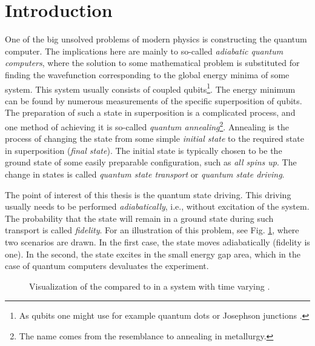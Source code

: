 \chapter*{Introduction}
One of the big unsolved problems of modern physics is constructing the quantum computer. The implications here are mainly to so-called \emph{adiabatic quantum computers}, where the solution to some mathematical problem is substituted for finding the wavefunction corresponding to the global energy minima of some system. This system usually consists of coupled qubits\footnote{As qubits one might use for example quantum dots \citep{dots} or Josephson junctions \citep{josephson}.}. The energy minimum can be found by numerous measurements of the specific superposition of qubits. The preparation of such a state in superposition is a complicated process, and one method of achieving it is so-called \emph{quantum annealing}\footnote{The name comes from the resemblance to annealing in metallurgy.}. Annealing is the process of changing the state from some simple \emph{initial state} to the required state in superposition (\emph{final state}). The initial state is typically chosen to be the ground state of some easily preparable configuration, such as \emph{all spins up}. The change in states is called \emph{quantum state transport} or \emph{quantum state driving}.

The point of interest of this thesis is the quantum state driving. This driving usually needs to be performed \emph{adiabatically}, i.e., without excitation of the system. The probability that the state will remain in a ground state during such transport is called \emph{fidelity}. For an illustration of this problem, see Fig. \ref{fig:introDriving}, where two scenarios are drawn. In the first case, the state moves adiabatically (fidelity is one). In the second, the state excites in the small energy gap area, which in the case of quantum computers devaluates the experiment.

\begin{figure}[H]
    \centering
\caption{Visualization of the  compared to  in a system with time varying .}
    \label{fig:introDriving}
\end{figure}

